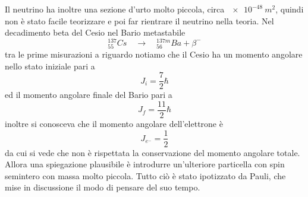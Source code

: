 Il neutrino ha inoltre una sezione d'urto molto piccola, circa $\SI{e-48}{m^2}$, quindi non è stato facile teorizzare e poi far rientrare il neutrino nella teoria. 
Nel decadimento beta del Cesio nel Bario metastabile
\begin{equation}
^{137}_{55}Cs \quad\rightarrow\quad ^{137m}_{56}Ba + \beta^-
\end{equation}
tra le prime misurazioni a riguardo notiamo che il Cesio ha un momento angolare nello stato iniziale pari a 
\begin{equation}
J_i = \frac{7}{2} \hbar
\end{equation}
ed il momento angolare finale del Bario pari a 
\begin{equation}
J_f = \frac{11}{2} \hbar
\end{equation}
inoltre si conosceva che il momento angolare dell'elettrone è 
\begin{equation}
J_{e^-} = \frac{1}{2}
\end{equation}
da cui si vede che non è rispettata la conservazione del momento angolare totale.
Allora una spiegazione plausibile è introdurre un'ulteriore particella con spin semintero con massa molto piccola.
Tutto ciò è stato ipotizzato da Pauli, che mise in discussione il modo di pensare del suo tempo.

















